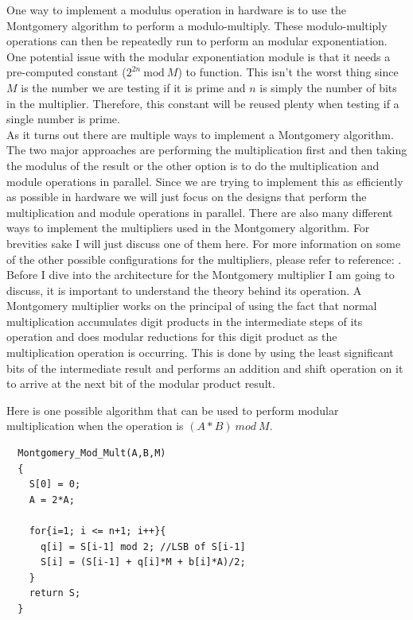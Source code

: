 \documentclass[journal]{IEEEtran}
\begin{document}
One way to implement a modulus operation in hardware is to use the Montgomery algorithm to perform a modulo-multiply. These modulo-multiply operations can then be repeatedly run to perform an modular exponentiation. One potential issue with the modular exponentiation module is that it needs a pre-computed constant ($2^{2n}\ \textrm{mod}\ M$) to function. This isn't the worst thing since $M$ is the number we are testing if it is prime and $n$ is simply the number of bits in the multiplier. Therefore, this constant will be reused plenty when testing if a single number is prime. \\

As it turns out there are multiple ways to implement a Montgomery algorithm. The two major approaches are performing the multiplication first and then taking the modulus of the result or the other option is to do the multiplication and module operations in parallel. Since we are trying to implement this as efficiently as possible in hardware we will just focus on the designs that perform the multiplication and module operations in parallel. There are also many different ways to implement the multipliers used in the Montgomery algorithm. For brevities sake I will just discuss one of them here. For more information on some of the other possible configurations for the multipliers, please refer to reference: \cite{daly}. \\

Before I dive into the architecture for the Montgomery multiplier I am going to discuss, it is important to understand the theory behind its operation. A Montgomery multiplier works on the principal of using the fact that normal multiplication accumulates digit products in the intermediate steps of its operation and does modular reductions for this digit product as the multiplication operation is occurring. This is done by using the least significant bits of the intermediate result and performs an addition and shift operation on it to arrive at the next bit of the modular product result. 

Here is one possible algorithm that can be used to perform modular multiplication when the operation is $(A * B)\ mod\ M$. \\

\begin{lstlisting}
  Montgomery_Mod_Mult(A,B,M)
  {
    S[0] = 0;
    A = 2*A;
	  
    for{i=1; i <= n+1; i++}{
      q[i] = S[i-1] mod 2; //LSB of S[i-1]
      S[i] = (S[i-1] + q[i]*M + b[i]*A)/2;
    }
    return S;
  }
\end{lstlisting}
\end{document}
